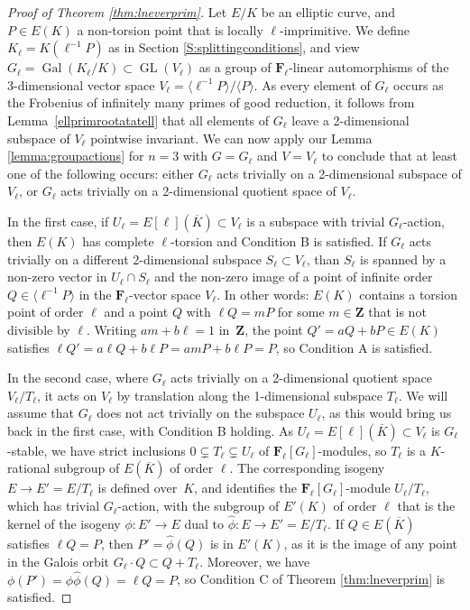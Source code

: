 \documentclass{amsart}
\theoremstyle{plain}
\theoremstyle{definition}
\DeclareMathOperator{\GL}{GL}
\DeclareMathOperator{\Gal}{Gal}
\newcommand{\FF}{{\mathbf{F}}}
\newcommand{\Zee}{{\mathbf{Z}}}
\begin{document}
\begin{proof}[Proof of Theorem \ref{thm:lneverprim}]
Let $E/K$ be an elliptic curve, and $P\in E(K)$ 
a non-torsion point that is locally $\ell$-imprimitive.
We define $K_\ell=K(\ell^{-1}P)$ as in Section \ref{S:splittingconditions},
and view $G_\ell=\Gal(K_\ell/K)\subset \GL(V_\ell)$ as 
a group of $\FF_\ell$-linear automorphisms of the 
3-dimensional vector space 
$V_\ell= \langle \ell^{-1}P\rangle/\langle P \rangle$.
As every element of $G_\ell$ occurs as the Frobenius 
of infinitely many primes of good reduction, it follows from
Lemma~\ref{ellprimrootatatell} that all elements of $G_\ell$
leave a 2-dimensional subspace of $V_\ell$ pointwise invariant.
We can now apply our Lemma \ref{lemma:groupactions}
for $n=3$ with $G=G_\ell$ and $V=V_\ell$ to conclude that at least one of the following occurs:
either $G_\ell$ acts trivially on a 2-dimensional subspace of $V_\ell$,
or $G_\ell$ acts trivially on a 2-dimensional quotient space of $V_\ell$.

In the first case, if $U_\ell=E[\ell](\overline K)\subset V_\ell$ is a subspace
with trivial $G_\ell$-action, then $E(K)$ has complete $\ell$-torsion
and Condition B is satisfied.
If $G_\ell$ acts trivially on a different 2-dimensional subspace
$S_\ell\subset V_\ell$, than $S_\ell$ is spanned by a non-zero
vector in $U_\ell\cap S_\ell$ and the non-zero image of a point of infinite order
$Q\in \langle \ell^{-1}P\rangle$ in the  $\FF_\ell$-vector space $V_\ell$.
In other words: $E(K)$ contains a torsion point of order $\ell$ and
a point $Q$ with $\ell Q=mP$ for some $m\in\Zee$ 
that is not divisible by $\ell$.
Writing $am+b\ell=1$ in~$\Zee$, the point $Q'=aQ+bP\in E(K)$ satisfies
$\ell Q'= a\ell Q+b\ell P=amP+b\ell P=P$, so Condition A is satisfied.

In the second case, where $G_\ell$ acts trivially on a 2-dimensional quotient space 
$V_\ell/T_\ell$, it acts on $V_\ell$ by translation along the 1-dimensional 
subspace $T_\ell$. 
We will assume that $G_\ell$ does not act trivially on the subspace $U_\ell$, 
as this would bring us back in the first case, with Condition B holding.
As $U_\ell=E[\ell](\overline K)\subset V_\ell$ is $G_\ell$-stable, we have 
strict inclusions $0\subsetneq T_\ell\subsetneq U_\ell$ of $\FF_\ell[G_\ell]$-modules,
so $T_\ell$ is a $K$-rational subgroup of $E(\overline K)$ of order $\ell$.
The corresponding isogeny $E\to E'=E/T_\ell$ is defined over~$K$,
and identifies the $\FF_\ell[G_\ell]$-module $U_\ell/ T_\ell$, which has trivial $G_\ell$-action,
with the subgroup of $E'(K)$ of order $\ell$ that is the kernel of the isogeny 
$\phi: E'\to E$ dual to $\widehat\phi: E\to E'=E/T_\ell$.
If $Q\in E(\overline K)$ satisfies $\ell Q=P$, then 
$P'=\widehat\phi(Q)$ is in $E'(K)$, as it is the image of any point in the Galois orbit 
$G_\ell\cdot Q\subset Q+T_\ell$.
Moreover, we have $\phi(P')=\phi\widehat\phi(Q)=\ell Q=P$, so Condition C 
of Theorem \ref{thm:lneverprim} is satisfied.


\end{proof}
\end{document}

